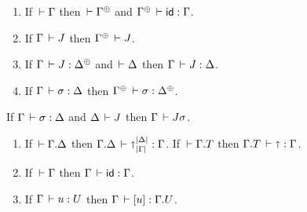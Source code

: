\documentclass[acmlarge,review,anonymous]{acmart}\settopmatter{printfolios=true}
\begin{document}
\begin{lemma}[Resurrection]
\label{lem:res} \bla
\begin{enumerate}
\item If\/ $\,\vdash \Gamma$ then $\der \resurrect\Gamma$ and $\resurrect \Gamma \der \sid : \Gamma$.
\item If\/ $\Gamma \,\vdash J$ then $\resurrect \Gamma \der J$.
\item If\/ $\Gamma \der J : \resurrect \Delta$ and $\,\vdash \Delta$ then $\Gamma \,\vdash J : \Delta$.
\item If\/ $\Gamma \,\vdash \sigma : \Delta$ then $\resurrect\Gamma \der \sigma : \resurrect\Delta$.
\end{enumerate}
\end{lemma}

\begin{lemma}[Substitution]
\label{lem:sub}\bla
  If\/ $\Gamma \,\vdash \sigma : \Delta$ and $\Delta \,\vdash J$ then $\Gamma \,\vdash J\sigma$.
\end{lemma}

\begin{lemma}
\label{lem:specsub}\bla
\begin{enumerate}
\item If $\,\vdash \Gamma. \Delta$ then $\Gamma. \Delta \,\vdash \mathord{\shortuparrow}_{|\Gamma|}^{|\Delta|} : \Gamma$.
      If $\,\vdash \Gamma. T$ then $\Gamma. T \,\vdash \mathord{\shortuparrow} : \Gamma$.
\item If $\,\vdash \Gamma$ then $\Gamma \,\vdash \mathsf{id} : \Gamma$.
\item If $\Gamma \,\vdash u : U$ then $\Gamma \,\vdash [u] : \Gamma. U$.
\end{enumerate}
\end{lemma}
\end{document}
